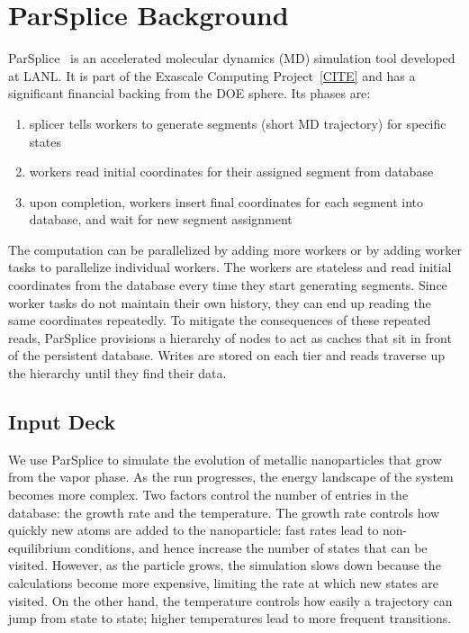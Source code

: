 \section{ParSplice Background}
\label{sec:parsplice}

ParSplice~\cite{perez:jctc20150parsplice} is an accelerated molecular dynamics
(MD) simulation tool developed at LANL. It is part of the Exascale Computing
Project~\ref{CITE} and has a significant financial backing from the DOE sphere.
Its phases are:

\begin{enumerate}

  \item splicer tells workers to generate segments (short MD trajectory) for
  specific states

  \item workers read initial coordinates for their assigned segment from database 

  \item upon completion, workers insert final coordinates for each segment into
  database, and wait for new segment assignment

\end{enumerate}

The computation can be parallelized by adding more workers or by adding worker
tasks to parallelize individual workers.  The workers are stateless and read
initial coordinates from the database every time they start generating
segments. Since worker tasks do not maintain their own history, they can end up
reading the same coordinates repeatedly. To mitigate the consequences of these
repeated reads, ParSplice provisions a hierarchy of nodes to act as caches that
sit in front of the persistent database.  Writes are stored on each tier and
reads traverse up the hierarchy until they find their data. 

\subsection*{Input Deck}

We use ParSplice to simulate the evolution of metallic nanoparticles that grow
from the vapor phase. As the run progresses, the energy landscape of the system
becomes more complex. Two factors control the number of entries in the
database: the growth rate and the temperature. The growth rate controls how
quickly new atoms are added to the nanoparticle: fast rates lead to
non-equilibrium conditions, and hence increase the number of states that can be
visited. However, as the particle grows, the simulation slows down because the
calculations become more expensive, limiting the rate at which new states are
visited. On the other hand, the temperature controls how easily a trajectory
can jump from state to state; higher temperatures lead to more frequent
transitions.

